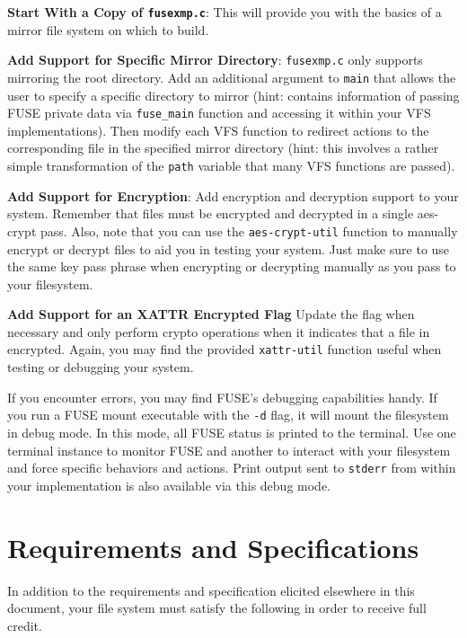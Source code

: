 \documentclass[12pt]{article}
\newenvironment{packed_enum}{
\begin{enumerate}
  \setlength{\itemsep}{1pt}
  \setlength{\parskip}{0pt}
  \setlength{\parsep}{0pt}
}{\end{enumerate}}
\begin{document}
\begin{packed_enum}
\item {\bf Start With a Copy of \texttt{fusexmp.c}}: This will provide
  you with the basics of a mirror file system on which to build.
\item {\bf Add Support for Specific Mirror Directory}:
  \texttt{fusexmp.c} only supports mirroring the root directory. Add an
  additional argument to \texttt{main} that allows the user to specify a specific
  directory to mirror (hint: \cite{pfeiffer-fuse} contains information
  of passing FUSE private data via \texttt{fuse\_main} function 
  and accessing it within your VFS implementations).
  Then modify each VFS function to redirect
  actions to the corresponding file in the specified mirror directory
  (hint: this involves a
  rather simple transformation of the \texttt{path} variable that many
  VFS functions are passed).
\item {\bf Add Support for Encryption}: Add encryption and decryption
  support to your system. Remember that files must be encrypted and
  decrypted in a single aes-crypt pass. Also, note that you can
  use the \texttt{aes-crypt-util} function to manually encrypt or decrypt files
  to aid you in testing your system. Just make sure to use the same
  key pass phrase when encrypting or decrypting manually as you pass to
  your filesystem.
\item {\bf Add Support for an XATTR Encrypted Flag} Update the flag
  when necessary and only perform crypto operations when it indicates
  that a file in encrypted. Again, you may find the provided
  \texttt{xattr-util} function useful when testing or debugging your
  system.
\end{packed_enum}

If you encounter errors, you may find FUSE's debugging capabilities
handy. If you run a FUSE mount executable with the \texttt{-d} flag, it
will mount the filesystem in debug mode. In this mode, all FUSE status
is printed to the terminal. Use one terminal instance to monitor FUSE
and another to interact with your filesystem and force specific
behaviors and actions. Print output sent to \texttt{stderr} from
within your implementation is also available via this debug mode.

\section{Requirements and Specifications}

In addition to the requirements and specification elicited elsewhere in
this document, your file system must satisfy the following in order to
receive full credit.
\end{document}
